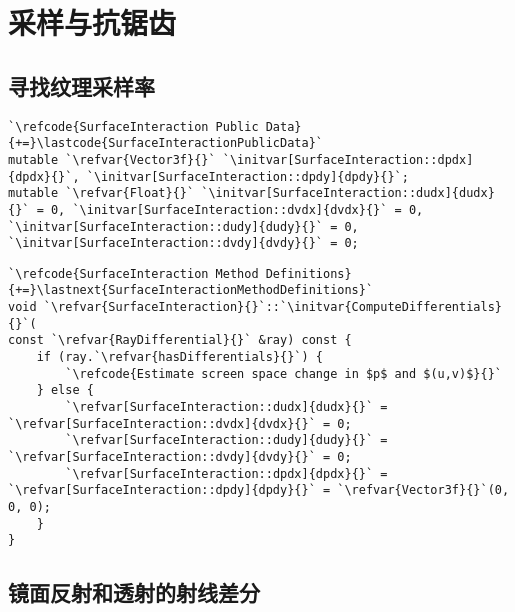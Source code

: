 \section{采样与抗锯齿}\label{sec:采样与抗锯齿}


\subsection{寻找纹理采样率}\label{sub:寻找纹理采样率}
\begin{lstlisting}
`\refcode{SurfaceInteraction Public Data}{+=}\lastcode{SurfaceInteractionPublicData}`
mutable `\refvar{Vector3f}{}` `\initvar[SurfaceInteraction::dpdx]{dpdx}{}`, `\initvar[SurfaceInteraction::dpdy]{dpdy}{}`;
mutable `\refvar{Float}{}` `\initvar[SurfaceInteraction::dudx]{dudx}{}` = 0, `\initvar[SurfaceInteraction::dvdx]{dvdx}{}` = 0, `\initvar[SurfaceInteraction::dudy]{dudy}{}` = 0, `\initvar[SurfaceInteraction::dvdy]{dvdy}{}` = 0;
\end{lstlisting}

\begin{lstlisting}
`\refcode{SurfaceInteraction Method Definitions}{+=}\lastnext{SurfaceInteractionMethodDefinitions}`
void `\refvar{SurfaceInteraction}{}`::`\initvar{ComputeDifferentials}{}`(
const `\refvar{RayDifferential}{}` &ray) const {
    if (ray.`\refvar{hasDifferentials}{}`) {
        `\refcode{Estimate screen space change in $p$ and $(u,v)$}{}`
    } else {
        `\refvar[SurfaceInteraction::dudx]{dudx}{}` = `\refvar[SurfaceInteraction::dvdx]{dvdx}{}` = 0;
        `\refvar[SurfaceInteraction::dudy]{dudy}{}` = `\refvar[SurfaceInteraction::dvdy]{dvdy}{}` = 0;
        `\refvar[SurfaceInteraction::dpdx]{dpdx}{}` = `\refvar[SurfaceInteraction::dpdy]{dpdy}{}` = `\refvar{Vector3f}{}`(0, 0, 0);
    }
}
\end{lstlisting}

\subsection{镜面反射和透射的射线差分}\label{sub:镜面反射和透射的射线差分}